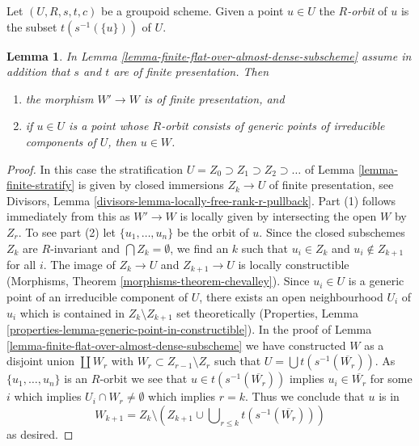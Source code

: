 \documentclass{stacks-project}
\theoremstyle{plain}
\newtheorem{lemma}[subsection]{Lemma}
\theoremstyle{definition}
\theoremstyle{remark}
\numberwithin{equation}{subsection}
\begin{document}
\noindent
Let $(U, R, s, t, c)$ be a groupoid scheme. Given a point $u \in U$
the {\it $R$-orbit} of $u$ is the subset $t(s^{-1}(\{u\}))$ of $U$.

\begin{lemma}
\label{lemma-finite-flat-over-almost-dense-subscheme-addendum}
In Lemma \ref{lemma-finite-flat-over-almost-dense-subscheme}
assume in addition that $s$ and $t$ are of finite presentation.
Then
\begin{enumerate}
\item the morphism $W' \to W$ is of finite presentation, and
\item if $u \in U$ is a point whose $R$-orbit consists of
generic points of irreducible components of $U$, then $u \in W$.
\end{enumerate}
\end{lemma}

\begin{proof}
In this case the stratification
$U = Z_0 \supset Z_1 \supset Z_2 \supset \ldots$ of
Lemma \ref{lemma-finite-stratify} is given by closed immersions $Z_k \to U$
of finite presentation, see
Divisors, Lemma \ref{divisors-lemma-locally-free-rank-r-pullback}.
Part (1) follows immediately from this as $W' \to W$ is locally given
by intersecting the open $W$ by $Z_r$. To see part (2)
let $\{u_1, \ldots, u_n\}$ be the orbit of $u$.
Since the closed subschemes $Z_k$ are $R$-invariant and
$\bigcap Z_k = \emptyset$, we find an $k$ such that $u_i \in Z_k$
and $u_i \not \in Z_{k + 1}$ for all $i$.
The image of $Z_k \to U$ and $Z_{k + 1} \to U$ is locally constructible
(Morphisms, Theorem \ref{morphisms-theorem-chevalley}).
Since $u_i \in U$ is a generic point of an irreducible component
of $U$, there exists an open neighbourhood $U_i$ of $u_i$ which
is contained in $Z_k \setminus Z_{k + 1}$ set theoretically
(Properties, Lemma \ref{properties-lemma-generic-point-in-constructible}).
In the proof of Lemma \ref{lemma-finite-flat-over-almost-dense-subscheme}
we have constructed $W$ as a disjoint union $\coprod W_r$
with $W_r \subset Z_{r - 1} \setminus Z_r$ such that
$U = \bigcup t(s^{-1}(\overline{W_r}))$. As $\{u_1, \ldots, u_n\}$
is an $R$-orbit we see that $u \in t(s^{-1}(\overline{W_r}))$
implies $u_i \in \overline{W_r}$ for some $i$ which implies
$U_i \cap W_r \not = \emptyset$ which implies $r = k$.
Thus we conclude that $u$ is in
$$
W_{k + 1} = Z_k \setminus
\left(
Z_{k + 1} \cup \bigcup\nolimits_{r \leq k} t(s^{-1}(\overline{W_r}))
\right)
$$
as desired.
\end{proof}
\end{document}
